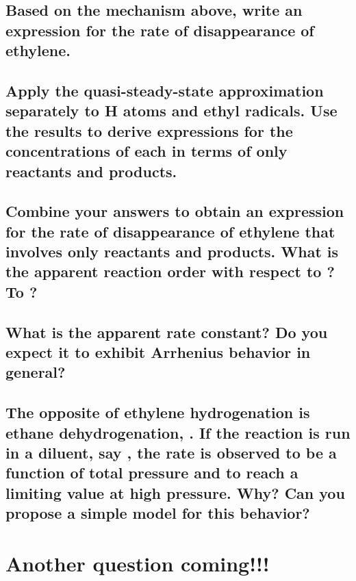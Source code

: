 \documentclass[11pt]{article}
\begin{document}
\subsection{Based on the mechanism above, write an expression for the rate of disappearance of ethylene.}
\label{sec:org51ceca3}

\subsection{Apply the quasi-steady-state approximation separately to H atoms and ethyl radicals.  Use the results to derive expressions for the concentrations of each in terms of only reactants and products.}
\label{sec:orgd041013}

\subsection{Combine your answers to  obtain an expression for the rate of disappearance of ethylene that involves only reactants and products.  What is the apparent reaction order with respect to ?  To ?}
\label{sec:org62f295b}

\subsection{What is the apparent rate constant?  Do you expect it to exhibit Arrhenius behavior in general?}
\label{sec:org6581b12}

\subsection{The opposite of ethylene hydrogenation is ethane dehydrogenation, . If the reaction is run in a diluent, say , the rate is observed to be a function of total pressure and to reach a limiting value at high pressure. Why? Can you propose a simple model for this behavior?}
\label{sec:org55db6a5}


\section{Another question coming!!!}
\label{sec:orgaefe6fd}
\end{document}
